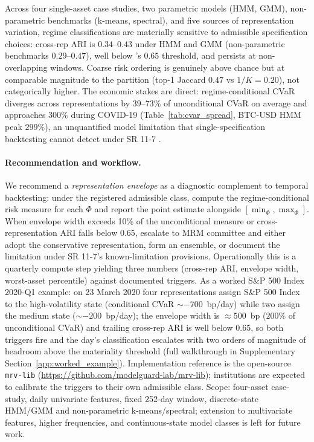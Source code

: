 \documentclass[preprint,12pt,authoryear]{elsarticle}
\newcommand{\SPX}{S\&P 500 Index}
\begin{document}
Across four single-asset case studies, two parametric models (HMM, GMM), non-parametric benchmarks (k-means, spectral), and five sources of representation variation, regime classifications are materially sensitive to admissible specification choices: cross-rep ARI is $0.34$--$0.43$ under HMM and GMM (non-parametric benchmarks $0.29$--$0.47$), well below \citet{Steinley2004}'s $0.65$ threshold, and persists at non-overlapping windows. Coarse risk ordering is genuinely above chance but at comparable magnitude to the partition (top-1 Jaccard $0.47$ vs $1/K=0.20$), not categorically higher. The economic stakes are direct: regime-conditional CVaR diverges across representations by $39$--$73\%$ of unconditional CVaR on average and approaches $300\%$ during COVID-19 (Table~\ref{tab:cvar_spread}, BTC-USD HMM peak $299\%$), an unquantified model limitation that single-specification backtesting cannot detect under SR 11-7 \citep{SR117}.

\paragraph{Recommendation and workflow.}
We recommend a \emph{representation envelope} as a diagnostic complement to temporal backtesting: under the registered admissible class, compute the regime-conditional risk measure for each $\Phi$ and report the point estimate alongside $[\min_\Phi, \max_\Phi]$. When envelope width exceeds 10\% of the unconditional measure or cross-representation ARI falls below 0.65, escalate to MRM committee and either adopt the conservative representation, form an ensemble, or document the limitation under SR 11-7's known-limitation provisions. Operationally this is a quarterly compute step yielding three numbers (cross-rep ARI, envelope width, worst-asset percentile) against documented triggers. As a worked \SPX{} 2020-Q1 example: on 23 March 2020 four representations assign \SPX{} to the high-volatility state (conditional CVaR ${\sim}{-}700$~bp/day) while two assign the medium state (${\sim}{-}200$~bp/day); the envelope width is ${\approx}500$~bp ($200\%$ of unconditional CVaR) and trailing cross-rep ARI is well below $0.65$, so both triggers fire and the day's classification escalates with two orders of magnitude of headroom above the materiality threshold (full walkthrough in Supplementary Section~\ref{app:worked_example}). Implementation reference is the open-source \texttt{mrv-lib} (\url{https://github.com/modelguard-lab/mrv-lib}); institutions are expected to calibrate the triggers to their own admissible class. Scope: four-asset case-study, daily univariate features, fixed 252-day window, discrete-state HMM/GMM and non-parametric k-means/spectral; extension to multivariate features, higher frequencies, and continuous-state model classes is left for future work.
\end{document}
